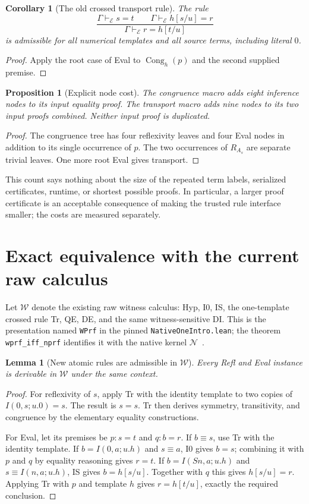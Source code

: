 \documentclass[11pt]{article}
\newtheorem{lemma}[theorem]{Lemma}
\newtheorem{proposition}[theorem]{Proposition}
\newtheorem{corollary}[theorem]{Corollary}
\theoremstyle{definition}
\newcommand{\E}{\mathcal E}
\newcommand{\W}{\mathcal W}
\newcommand{\N}{\mathcal N}
\newcommand{\syn}{\equiv}
\newcommand{\prf}[2]{#1\vdash_{\E}#2}
\begin{document}
\begin{corollary}[The old crossed transport rule]
\label{cor:transport}
The rule
\[
 \frac{\prf{\Gamma}{s=t}\qquad\prf{\Gamma}{h[s/u]=r}}
       {\prf{\Gamma}{r=h[t/u]}}
 \tag{Tr}\label{eq:tr}
\]
is admissible for all numerical templates and all source terms, including
literal $0$.
\end{corollary}
\begin{proof}
Apply the root case of Eval to $\operatorname{Cong}_h(p)$ and the second
supplied premise.
\end{proof}

\begin{proposition}[Explicit node cost]
The congruence macro adds eight inference nodes to its input equality
proof. The transport macro adds nine nodes to its two input proofs
combined. Neither input proof is duplicated.
\end{proposition}
\begin{proof}
The congruence tree has four reflexivity leaves and four Eval nodes in
addition to its single occurrence of $p$. The two occurrences of
$R_{A_s}$ are separate trivial leaves. One more root Eval gives transport.
\end{proof}

This count says nothing about the size of the repeated term labels,
serialized certificates, runtime, or shortest possible proofs. In
particular, a larger proof certificate is an acceptable consequence of
making the trusted rule interface smaller; the costs are measured separately.

\section{Exact equivalence with the current raw calculus}
\label{sec:equivalence}

Let $\W$ denote the existing raw witness calculus: Hyp, I0, IS, the
one-template crossed rule Tr, QE, DE, and the same witness-sensitive DI.
This is the presentation named \texttt{WPrf} in the pinned
\texttt{NativeOneIntro.lean}; the theorem
\texttt{wprf\_iff\_nprf} identifies it with the native kernel
$\N$~\cite{oneintro}.

\begin{lemma}[New atomic rules are admissible in $\W$]
Every Refl and Eval instance is derivable in $\W$ under the same context.
\end{lemma}
\begin{proof}
For reflexivity of $s$, apply Tr with the identity template to two copies
of $I(0,s;u.0)=s$. The result is $s=s$. Tr then derives symmetry,
transitivity, and congruence by the elementary equality constructions.

For Eval, let its premises be $p:s=t$ and $q:b=r$.
If $b\syn s$, use Tr with the identity template.
If $b=I(0,a;u.h)$ and $s\syn a$, I0 gives $b=s$; combining it with
$p$ and $q$ by equality reasoning gives $r=t$.
If $b=I(Sn,a;u.h)$ and $s\syn I(n,a;u.h)$, IS gives $b=h[s/u]$.
Together with $q$ this gives $h[s/u]=r$. Applying Tr with $p$ and
template $h$ gives $r=h[t/u]$, exactly the required conclusion.
\end{proof}
\end{document}
